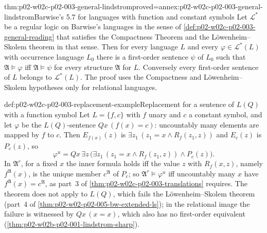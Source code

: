 \begin{hbtheorem}{thm:p02-w02c-p02-003-general-lindstrom}{proved=annex:p02-w02c-p02-003-general-lindstrom}{Barwise's 5.7 for languages with function and constant symbols}
Let \(\mathcal L^{\ast}\) be a regular logic on Barwise's languages in the
sense of \cref{def:p02-w02c-p02-003-general-reading} that satisfies the
Compactness Theorem and the L\"owenheim--Skolem theorem in that sense.
Then for every language \(L\) and every \(\varphi\in\mathcal L^{\ast}(L)\)
with occurrence language \(L_0\) there is a first-order sentence \(\psi\)
of \(L_0\) such that \(\mathfrak A\models\varphi\) iff
\(\mathfrak A\models\psi\) for every structure \(\mathfrak A\) for \(L\).
Conversely every first-order sentence of \(L\) belongs to
\(\mathcal L^{\ast}(L)\).  The proof uses the Compactness and
L\"owenheim--Skolem hypotheses only for relational languages.
\end{hbtheorem}

\begin{hbexample}{def:p02-w02c-p02-003-replacement-example}{Replacement for a sentence of \(L(Q)\) with a function symbol}
Let \(L=\{f,c\}\) with \(f\) unary and \(c\) a constant symbol, and let
\(\varphi\) be the \(L(Q)\)-sentence \(Qx\,(f(x)=c)\): uncountably many
elements are mapped by \(f\) to \(c\).  Then \(E_{f(x)}(z)\) is
\(\exists z_1\,(z_1=x\land R_f(z_1,z))\) and \(E_c(z)\) is \(P_c(z)\), so
\[
 \varphi^{u}=Qx\,\exists z\,\bigl(\exists z_1\,(z_1=x\land R_f(z_1,z))\land P_c(z)\bigr).
\]
In \(\mathfrak A^{r}\), for a fixed \(x\) the inner formula holds iff the
value \(z\) with \(R_f(x,z)\), namely \(f^{\mathfrak A}(x)\), is the unique
member \(c^{\mathfrak A}\) of \(P_c\); so \(\mathfrak A^{r}\models\varphi^{u}\)
iff uncountably many \(x\) have \(f^{\mathfrak A}(x)=c^{\mathfrak A}\), as
part~3 of \cref{thm:p02-w02c-p02-003-translations} requires.  The theorem
does not apply to \(L(Q)\), which fails the L\"owenheim--Skolem theorem
(part~4 of \cref{thm:p02-w02-p02-005-bw-extended-ls}); in the relational
image the failure is witnessed by \(Qx\,(x=x)\), which also has no
first-order equivalent (\cref{thm:p02-w02b-p02-001-lindstrom-sharp}).
\end{hbexample}

